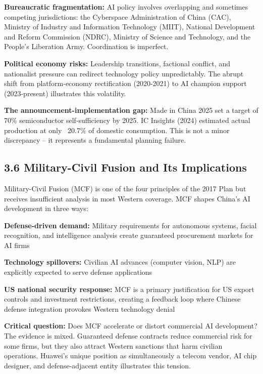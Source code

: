 \documentclass[11pt,a4paper]{article}
\begin{document}
\textbf{Bureaucratic fragmentation:} AI policy involves overlapping and sometimes competing jurisdictions: the Cyberspace Administration of China (CAC), Ministry of Industry and Information Technology (MIIT), National Development and Reform Commission (NDRC), Ministry of Science and Technology, and the People's Liberation Army. Coordination is imperfect.

\textbf{Political economy risks:} Leadership transitions, factional conflict, and nationalist pressure can redirect technology policy unpredictably. The abrupt shift from platform-economy rectification (2020-2021) to AI champion support (2023-present) illustrates this volatility.

\textbf{The announcement-implementation gap:} Made in China 2025 set a target of 70\% semiconductor self-sufficiency by 2025. IC Insights (2024) estimated actual production at only ~20.7\% of domestic consumption. This is not a minor discrepancy -- it represents a fundamental planning failure.


\subsection{3.6 Military-Civil Fusion and Its Implications}

Military-Civil Fusion (MCF) is one of the four principles of the 2017 Plan but receives insufficient analysis in most Western coverage. MCF shapes China's AI development in three ways:

\item \textbf{Defense-driven demand:} Military requirements for autonomous systems, facial recognition, and intelligence analysis create guaranteed procurement markets for AI firms
\item \textbf{Technology spillovers:} Civilian AI advances (computer vision, NLP) are explicitly expected to serve defense applications
\item \textbf{US national security response:} MCF is a primary justification for US export controls and investment restrictions, creating a feedback loop where Chinese defense integration provokes Western technology denial

\textbf{Critical question:} Does MCF accelerate or distort commercial AI development? The evidence is mixed. Guaranteed defense contracts reduce commercial risk for some firms, but they also attract Western sanctions that harm civilian operations. Huawei's unique position as simultaneously a telecom vendor, AI chip designer, and defense-adjacent entity illustrates this tension.
\end{document}
